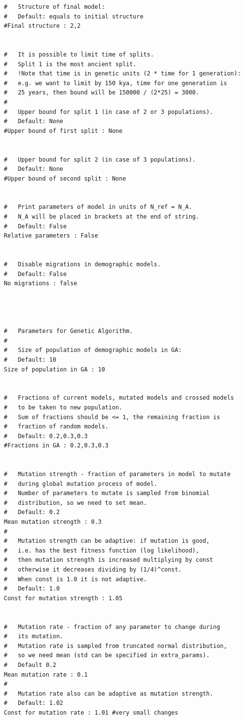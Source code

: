 \documentclass[12pt]{article}
\begin{document}
\begin{appendices}
\begin{lstlisting}
#   Structure of final model:
#   Default: equals to initial structure
#Final structure : 2,2


#   It is possible to limit time of splits.
#   Split 1 is the most ancient split.
#   !Note that time is in genetic units (2 * time for 1 generation):
#   e.g. we want to limit by 150 kya, time for one generation is 
#   25 years, then bound will be 150000 / (2*25) = 3000.
#
#   Upper bound for split 1 (in case of 2 or 3 populations).
#   Default: None
#Upper bound of first split : None


#   Upper bound for split 2 (in case of 3 populations).
#   Default: None
#Upper bound of second split : None


#	Print parameters of model in units of N_ref = N_A.
#   N_A will be placed in brackets at the end of string.
#   Default: False
Relative parameters : False


#   Disable migrations in demographic models.
#   Default: False
No migrations : false




#   Parameters for Genetic Algorithm.
#
#   Size of population of demographic models in GA:
#   Default: 10
Size of population in GA : 10


#   Fractions of current models, mutated models and crossed models 
#   to be taken to new population.
#   Sum of fractions should be <= 1, the remaining fraction is 
#   fraction of random models.
#   Default: 0.2,0.3,0.3
#Fractions in GA : 0.2,0.3,0.3


#   Mutation strength - fraction of parameters in model to mutate 
#   during global mutation process of model.
#   Number of parameters to mutate is sampled from binomial 
#   distribution, so we need to set mean.
#   Default: 0.2
Mean mutation strength : 0.3
#
#   Mutation strength can be adaptive: if mutation is good, 
#   i.e. has the best fitness function (log likelihood),
#   then mutation strength is increased multiplying by const 
#   otherwise it decreases dividing by (1/4)^const.
#   When const is 1.0 it is not adaptive.
#   Default: 1.0
Const for mutation strength : 1.05


#   Mutation rate - fraction of any parameter to change during
#   its mutation.
#   Mutation rate is sampled from truncated normal distribution, 
#   so we need mean (std can be specified in extra_params).
#   Default 0.2
Mean mutation rate : 0.1
#
#   Mutation rate also can be adaptive as mutation strength.
#   Default: 1.02
Const for mutation rate : 1.01 #very small changes



\end{lstlisting}
\end{appendices}
\end{document}
